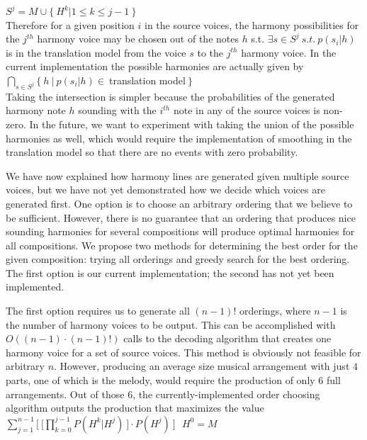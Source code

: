 \documentclass{sig-alternate}
\begin{document}
$S^{j} = {M} \cup \{\ H^k | 1 \leq k \leq j- 1\ \} $\\


Therefore for a given position $i$ in the source voices, the harmony possibilities for the $j^{th}$ harmony voice may be chosen out of the notes $h$ s.t. $\exists s \in S^{j}\ s.t.\ p(s_{i}|h)$ is in the translation model from the voice $s$ to the $j^{th}$ harmony voice. In the current implementation the possible harmonies are actually given by \\

$\bigcap_{s \in S^{j}} \{\ h\ |\ p(s_{i} | h) \in\ $translation model$\ \}$\\

Taking the intersection is simpler because the probabilities of the generated harmony note $h$ sounding with the $i^{th}$ note in any of the source voices is non-zero. In the future, we want to experiment with taking the union of the possible harmonies as well, which would require the implementation of smoothing in the translation model so that there are no events with zero probability. 

We have now explained how harmony lines are generated given multiple source voices, but we have not yet demonstrated how we decide which voices are generated first. One option is to choose an arbitrary ordering that we believe to be sufficient. However, there is no guarantee that an ordering that produces nice sounding harmonies for several compositions will produce optimal harmonies for all compositions. We propose two methods for determining the best order for the given composition: trying all orderings and greedy search for the best ordering. The first option is our current implementation; the second has not yet been implemented.

The first option requires us to generate all $(n - 1)!$ orderings, where $n - 1$ is the number of harmony voices to be output. This can be accomplished with $O((n - 1) \cdot (n - 1)!)$ calls to the decoding algorithm that creates one harmony voice for a set of source voices. This method is obviously not feasible for arbitrary $n$. However, producing an average size musical arrangement with just $4$ parts, one of which is the melody, would require the production of only $6$ full arrangements. Out of those $6$, the currently-implemented order choosing algorithm outputs the production that maximizes the value\\

$\sum_{j = 1}^{n - 1} \lbrack\ \lbrack\prod_{k = 0}^{j - 1} P(H^{k} | H^{j})\ \rbrack \cdot P(H^{j})\ \rbrack\ \ \ H^{0} = M$\\
\end{document}
